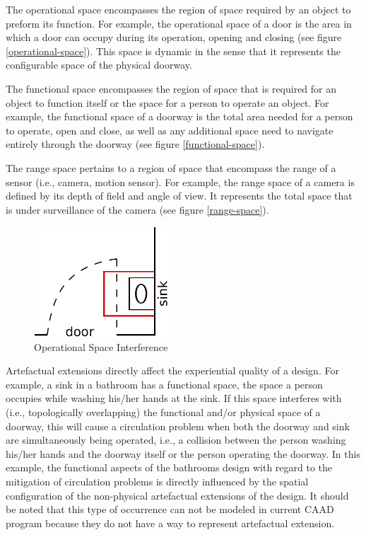 \documentclass[12pt]{ucthesis}
\begin{document}
The operational space encompasses the region of space required by an object to preform its function. For example, the operational space of a door is the area in which a door can occupy during its operation, opening and closing (see figure \ref{operational-space}). This space is dynamic in the sense that it represents the configurable space of the physical doorway. 

The functional space encompasses the region of space that is required for an object to function itself or the space for a person to operate an object. For example, the functional space of a doorway is the total area needed for a person to operate, open and close, as well as any additional space need to navigate entirely through the doorway (see figure \ref{functional-space}). 

The range space pertains to a region of space that encompass the range of a sensor (i.e., camera, motion sensor). For example, the range space of a camera is defined by its depth of field and angle of view. It represents the total space that is under surveillance of the camera (see figure \ref{range-space}).

\begin{figure}[H]
\centering
\includegraphics[width=50mm]{door-sink}
\caption{Operational Space Interference}
\label{door-sink}
\end{figure}

Artefactual extensions directly affect the experiential quality of a design. For example, a sink in a bathroom has a functional space, the space a person occupies while washing his/her hands at the sink. If this space interferes with (i.e., topologically overlapping) the functional and/or physical space of a doorway, this will cause a circulation problem when both the doorway and sink are simultaneously being operated, i.e., a collision between the person washing his/her hands and the doorway itself or the person operating the doorway. In this example, the functional aspects of the bathrooms design with regard to the mitigation of circulation problems is directly influenced by the spatial configuration of the non-physical artefactual extensions of the design. It should be noted that this type of occurrence can not be modeled in current CAAD program because they do not have a way to represent artefactual extension.
\end{document}
